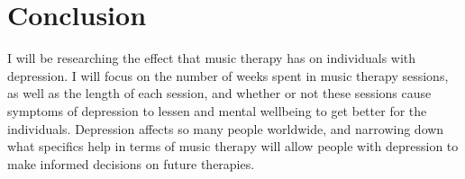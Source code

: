 \documentclass[12pt]{article}
\begin{document}
 \section{Conclusion}
 \label{sec:con}
 
 I will be researching the effect that music therapy has on individuals with depression. I will focus on the number of weeks spent in music therapy sessions, as well as the length of each session, and whether or not these sessions cause symptoms of depression to lessen and mental wellbeing to get better for the individuals. Depression affects so many people worldwide, and narrowing down what specifics help in terms of music therapy will allow people with depression to make informed decisions on future therapies.

 
 {}
\end{document}
